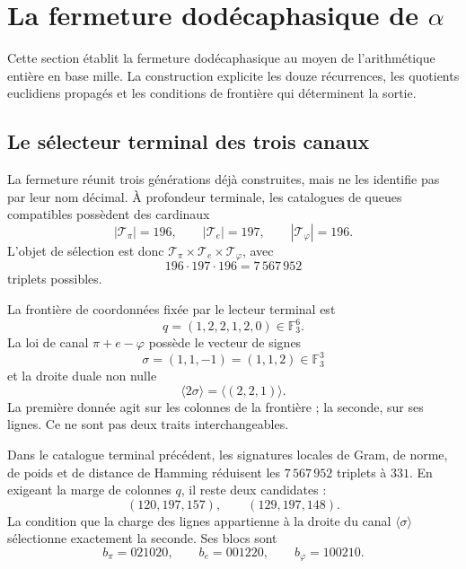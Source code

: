 \chapter{La fermeture dodécaphasique de \texorpdfstring{\(\alpha\)}{alpha}}
\label{chap:alpha}

Cette section établit la fermeture dodécaphasique au moyen de l'arithmétique entière en
base mille. La construction explicite les douze récurrences, les quotients
euclidiens propagés et les conditions de frontière qui déterminent la sortie.

\section{Le sélecteur terminal des trois canaux}
\label{sec:selector-terminal-alpha-rev6}

La fermeture réunit trois générations déjà construites, mais ne les identifie pas par
leur nom décimal. À profondeur terminale, les catalogues de queues compatibles
possèdent des cardinaux
\[
 |\mathcal T_\pi|=196,\qquad
 |\mathcal T_e|=197,\qquad
 |\mathcal T_\varphi|=196.
\]
L'objet de sélection est donc
\(\mathcal T_\pi\times\mathcal T_e\times\mathcal T_\varphi\), avec
\[
 196\cdot197\cdot196=7\,567\,952
\]
triplets possibles.

La frontière de coordonnées fixée par le lecteur terminal est
\[
 q=(1,2,2,1,2,0)\in\mathbb F_3^6.
\]
La loi de canal \(\pi+e-\varphi\) possède le vecteur de signes
\[
 \sigma=(1,1,-1)=(1,1,2)\in\mathbb F_3^3
\]
et la droite duale non nulle
\[
 \langle2\sigma\rangle
 =\langle(2,2,1)\rangle.
\]
La première donnée agit sur les colonnes de la frontière ; la seconde, sur
ses lignes. Ce ne sont pas deux traits interchangeables.

\begin{theorem}
\label{thm:selector-terminal-alpha-rev6}
Dans le catalogue terminal précédent, les signatures locales de Gram, de norme, de poids et de
distance de Hamming réduisent les \(7\,567\,952\) triplets à \(331\). En exigeant
la marge de colonnes \(q\), il reste deux candidates :
\[
 (120,197,157),\qquad(129,197,148).
\]
La condition que la charge des lignes appartienne à la droite du canal
\(\langle\sigma\rangle\) sélectionne exactement la seconde. Ses blocs sont
\[
 \boxed{
 b_\pi=021020,\qquad
 b_e=001220,\qquad
 b_\varphi=100210.}
\]
\end{theorem}

